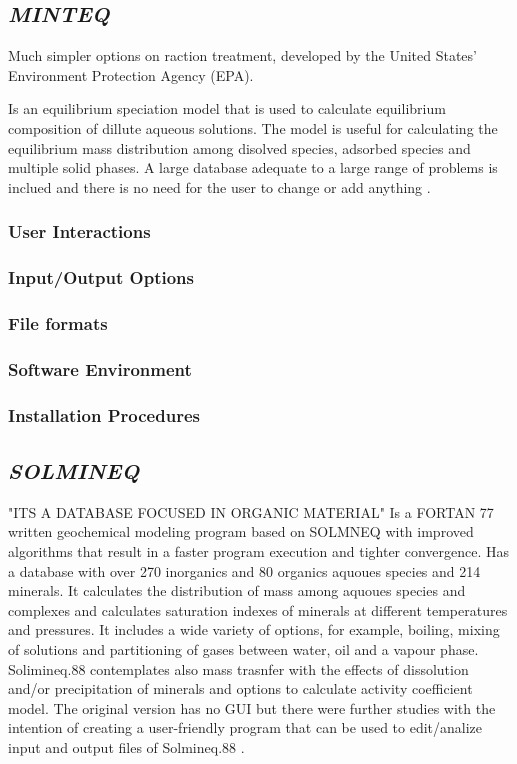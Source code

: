 \documentclass[ppgc,mestrado,english]{iiufrgs}
\begin{document}
\subsection{\emph{MINTEQ}}
Much simpler options on raction treatment, developed by the United States' Environment Protection Agency (EPA). 

Is an equilibrium speciation model that is used to calculate equilibrium composition of dillute aqueous solutions. The model is useful for calculating the equilibrium mass distribution among disolved species, adsorbed species and multiple solid phases. A large database adequate to a large range of problems is inclued and there is no need for the user to change or add anything \cite{Brown:87} \cite{Allison:91}.

\subsubsection{User Interactions}
\subsubsection{Input/Output Options}
\subsubsection{File formats}
\subsubsection{Software Environment}
\subsubsection{Installation Procedures}

\subsection{\emph{SOLMINEQ}} "ITS A DATABASE FOCUSED IN ORGANIC MATERIAL"
Is a FORTAN 77 written geochemical modeling program based on SOLMNEQ with improved algorithms that result in a faster program execution and tighter convergence. Has a database with over 270 inorganics and 80 organics aquoues species and 214 minerals. It calculates the distribution of mass among aquoues species and complexes and calculates saturation indexes of minerals at different temperatures and pressures. It includes a wide variety of options, for example, boiling, mixing of solutions and partitioning of gases between water, oil and a vapour phase. Solimineq.88 contemplates also mass trasnfer with the effects of dissolution and/or precipitation of minerals and options to calculate activity coefficient model. The original version has no GUI but there were further studies with the intention of creating a user-friendly program that can be used to edit/analize input and output files of Solmineq.88 \cite{Kharaka:73}.
\end{document}
